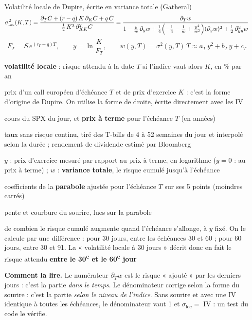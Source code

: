 \documentclass[10pt,a4paper]{article}
\newcommand{\notation}[2]{\makebox[2.3cm][l]{#1}\parbox[t]{\dimexpr\linewidth-2.3cm\relax}{#2}\par}
\begin{document}
\begin{formule}{Volatilité locale de Dupire, écrite en variance totale (Gatheral)}
\begin{equation}\label{eq:dupire}
\sigma^2_{\mathrm{loc}}(K,T)=\frac{\partial_T C+(r-q)\,K\,\partial_K C+q\,C}{\tfrac12\,K^2\,\partial^2_{KK}C}
=\frac{\partial_T w}{1-\frac{y}{w}\,\partial_y w+\frac14\Bigl(-\frac14-\frac1w+\frac{y^2}{w^2}\Bigr)(\partial_y w)^2+\frac12\,\partial^2_{yy}w}
\end{equation}
\begin{equation}\label{eq:lissage}
F_T=S\,e^{(r_T-q)T},\qquad y=\ln\frac{K}{F_T},\qquad w(y,T)=\sigma^2(y,T)\,T\approx a_T\,y^2+b_T\,y+c_T
\end{equation}
\notation{$\sigma_{\mathrm{loc}}(K,T)$}{\textbf{volatilité locale} : risque attendu à la date $T$ si l'indice vaut alors $K$, en \% par an}
\notation{$C(T,K)$}{prix d'un call européen d'échéance $T$ et de prix d'exercice $K$ : c'est la forme d'origine de Dupire. On utilise la forme de droite, écrite directement avec les IV \cite{gatheral}}
\notation{$S,\ F_T$}{cours du SPX du jour, et \textbf{prix à terme} pour l'échéance $T$ (en années)}
\notation{$r_T,\ q$}{taux sans risque continu, tiré des T-bills de 4 à 52 semaines du jour et interpolé selon la durée ; rendement de dividende estimé par Bloomberg}
\notation{$y,\ w$}{$y$ : prix d'exercice mesuré par rapport au prix à terme, en logarithme ($y=0$ : au prix à terme) ; $w$ : \textbf{variance totale}, le risque cumulé jusqu'à l'échéance}
\notation{$a_T,b_T,c_T$}{coefficients de la \textbf{parabole} ajustée pour l'échéance $T$ sur ses 5 points (moindres carrés)}
\notation{$\partial_y w,\ \partial^2_{yy}w$}{pente et courbure du sourire, lues sur la parabole}
\notation{$\partial_T w$}{de combien le risque cumulé augmente quand l'échéance s'allonge, à $y$ fixé. On le calcule par une différence : pour 30 jours, entre les échéances 30 et 60 ; pour 60 jours, entre 30 et 91. La « volatilité locale à 30 jours » décrit donc en fait le risque attendu \textbf{entre le 30\textsuperscript{e} et le 60\textsuperscript{e} jour}}
\end{formule}
\textbf{Comment la lire.} Le numérateur $\partial_T w$ est le risque « ajouté » par les derniers jours : c'est la partie \emph{dans le temps}. Le dénominateur corrige selon la forme du sourire : c'est la partie \emph{selon le niveau de l'indice}. Sans sourire et avec une IV identique à toutes les échéances, le dénominateur vaut 1 et $\sigma_{\mathrm{loc}}=$ IV : un test du code le vérifie.
\end{document}
